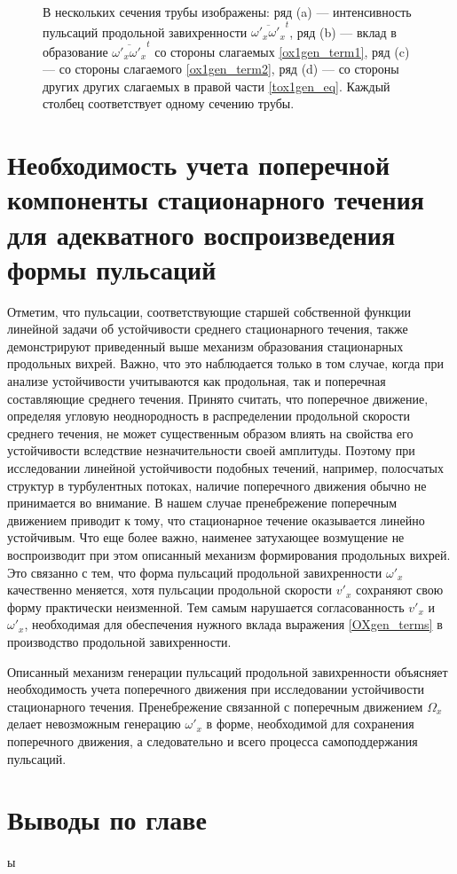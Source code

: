 \begin{figure}
\caption{В нескольких сечения трубы изображены: ряд (a) --- интенсивность пульсаций продольной завихренности $\overline{\omega'_x \omega'_x}^t$, ряд (b) --- вклад в образование $\overline{\omega'_x \omega'_x}^t$ со стороны слагаемых \eqref{ox1gen_term1}, ряд (c) --- со стороны слагаемого \eqref{ox1gen_term2}, ряд (d) --- со стороны других других слагаемых в правой части \eqref{tox1gen_eq}. Каждый столбец соответствует одному сечению трубы. }
\label{puff_ox1gen_pic}
\end{figure}

\section{Необходимость учета поперечной компоненты стационарного течения для адекватного воспроизведения формы пульсаций}

Отметим, что пульсации, соответствующие старшей собственной функции линейной задачи об устойчивости среднего стационарного течения, также демонстрируют приведенный выше механизм образования стационарных продольных вихрей. Важно, что это наблюдается только в том случае, когда при анализе устойчивости учитываются как продольная, так и поперечная составляющие среднего течения. Принято считать, что поперечное движение, определяя угловую неоднородность в распределении продольной скорости среднего течения, не может существенным образом влиять на свойства его устойчивости вследствие незначительности своей амплитуды. Поэтому при исследовании линейной устойчивости подобных течений, например, полосчатых структур в турбулентных потоках, наличие поперечного движения обычно не принимается во внимание. В нашем случае пренебрежение поперечным движением приводит к тому, что стационарное течение оказывается линейно устойчивым. Что еще более важно, наименее затухающее возмущение не воспроизводит при этом описанный механизм формирования продольных вихрей. Это связанно с тем, что форма пульсаций продольной завихренности $\omega'_x$ качественно меняется, хотя пульсации продольной скорости $v'_x$ сохраняют свою форму практически неизменной. Тем самым нарушается согласованность  $v'_x$ и $\omega'_x$, необходимая для обеспечения нужного вклада выражения \eqref{OXgen_terms} в производство продольной завихренности.


Описанный механизм генерации пульсаций продольной завихренности объясняет необходимость учета поперечного движения при исследовании устойчивости стационарного течения. Пренебрежение связанной с поперечным движением $\Omega_x$ делает невозможным генерацию $\omega'_x$ в форме, необходимой для сохранения поперечного движения, а следовательно и всего процесса самоподдержания пульсаций.


\section{Выводы по главе}

ы
